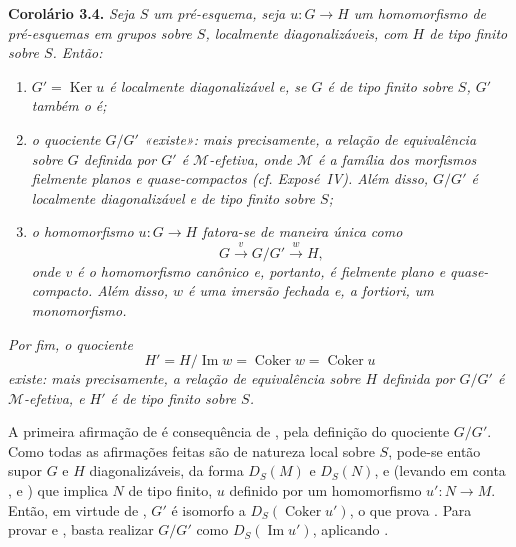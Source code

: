 \medskip
\noindent{}\textbf{Corolário 3.4.}
\textit{Seja \(S\) um pré-esquema, seja \(u:G\to H\) um homomorfismo de
pré-esquemas em grupos sobre \(S\), localmente diagonalizáveis, com \(H\) de
tipo finito sobre \(S\). Então:}
\begin{enumerate}
  \item[(a)]
  \textit{\(G'=\operatorname{Ker}u\) é localmente diagonalizável e, se \(G\) é de tipo
  finito sobre \(S\), \(G'\) também o é;}

  \item[(b)]
  \textit{o quociente \(G/G'\) «existe»: mais precisamente, a relação de
  equivalência sobre \(G\) definida por \(G'\) é \(\mathcal M\)-efetiva,
  onde \(\mathcal M\) é a família dos morfismos fielmente planos e
  quase-compactos (cf. Exposé~IV). Além disso,
  \(G/G'\) é localmente diagonalizável e de tipo finito sobre \(S\);}

  \item[(c)]
  \textit{o homomorfismo \(u:G\to H\) fatora-se de maneira única como}
  \[
    G\xrightarrow{v}G/G'\xrightarrow{w}H,
  \]
  \textit{onde \(v\) é o homomorfismo canônico e, portanto, é
  fielmente plano e quase-compacto. Além disso, \(w\) é uma imersão fechada
  e, a fortiori, um monomorfismo.}
\end{enumerate}
\textit{Por fim, o quociente}
\[
  H'=H/\operatorname{Im}w
    =\operatorname{Coker}w
    =\operatorname{Coker}u
\]
\textit{existe: mais precisamente, a relação de equivalência sobre \(H\)
definida por \(G/G'\) é \(\mathcal M\)-efetiva, e \(H'\) é de tipo
finito sobre \(S\).}

A primeira afirmação de
 é consequência de
, pela definição do
quociente \(G/G'\). Como todas as afirmações feitas são de natureza
local sobre \(S\), pode-se então supor \(G\) e \(H\) diagonalizáveis,
da forma \(D_S(M)\) e \(D_S(N)\), e (levando em conta
, e
) que implica
\(N\) de tipo finito, \(u\) definido por um homomorfismo \(u':N\to M\).
Então, em virtude de ,
\(G'\) é isomorfo a \(D_S(\operatorname{Coker}u')\), o que prova
. Para provar
 e
, basta realizar
\(G/G'\) como \(D_S(\operatorname{Im}u')\), aplicando
.

